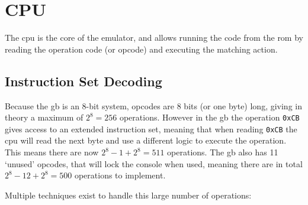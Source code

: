 \documentclass[11pt]{report}
\begin{document}
\section{CPU}

The \gls{cpu} is the core of the emulator, and allows running the code from the \gls{rom} by reading the operation code (or opcode) and executing the matching action.

\subsection{Instruction Set Decoding}

Because the \glsdesc{gb} is an 8-bit system, opcodes are 8 bits (or one byte) long, giving in theory a maximum of $2^8=256$ operations. However in the \gls{gb} the operation \texttt{0xCB} gives access to an extended instruction set, meaning that when reading \texttt{0xCB} the \gls{cpu} will read the next byte and use a different logic to execute the operation. This means there are now $2^8 - 1 + 2^8=511$ operations. The \gls{gb} also has 11 `unused' opcodes, that will lock the console when used\cite[CPU Comparison with Z80]{pandoc}, meaning there are in total $2^8 - 12 + 2^8 = 500$ operations to implement.

Multiple techniques exist to handle this large number of operations:
\end{document}
